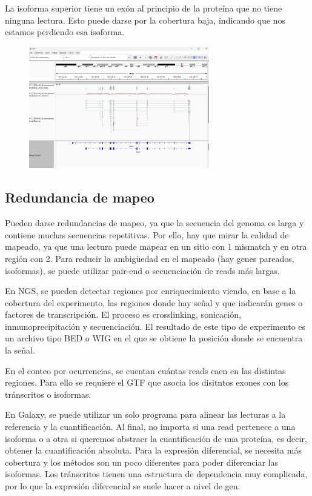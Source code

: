 La isoforma superior tiene un exón al principio de la proteína que no tiene ninguna lectura. Esto puede darse por la cobertura baja, indicando que nos estamos perdiendo esa isoforma.

\begin{figure}[h]
\centering
\includegraphics[width = 0.7\textwidth]{figs/igv-1.png}
\end{figure}

\subsection{Redundancia de mapeo}
Pueden darse redundancias de mapeo, ya que la secuencia del genoma es larga y contiene muchas secuencias repetitivas. Por ello, hay que mirar la calidad de mapeado, ya que una lectura puede mapear en un sitio con 1 mismatch y en otra región con 2. Para reducir la ambigüedad en el mapeado (hay genes pareados, isoformas), se puede utilizar pair-end o secuenciación de reads más largas. 

En NGS, se pueden detectar regiones por enriquecimiento viendo, en base a la cobertura del experimento, las regiones donde hay señal y que indicarán genes o factores de transcripción. El proceso es crosslinking, sonicación, inmunoprecipitación y secuenciación. El resultado de este tipo de experimento es un archivo tipo BED o WIG en el que se obtiene la posición donde se encuentra la señal.

En el conteo por ocurrencias, se cuentan cuántas reads caen en las distintas regiones. Para ello se requiere el GTF que asocia los disitntos exones con los tránscritos o isoformas.

En Galaxy, se puede utilizar un solo programa para alinear las lecturas a la referencia y la cuantificación. Al final, no importa si una read pertenece a una isoforma o a otra si queremos abstraer la cuantificación de una proteína, es decir, obtener la cuantificación absoluta. Para la expresión diferencial, se necesita más cobertura y los métodos son un poco diferentes para poder diferenciar las isoformas. Los tránscritos tienen una estructura de dependencia muy complicada, por lo que la expresión diferencial se suele hacer a nivel de gen.

